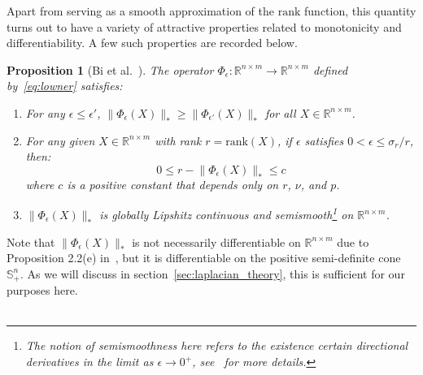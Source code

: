 \documentclass[10pt]{article}
\numberwithin{equation}{section}
\newcommand{\+}{%
	\raisebox{0.18ex}{\scaleobj{0.55}{+}}
}
\newtheorem{proposition}{Proposition}
\theoremstyle{definition}
\theoremstyle{definition}
\begin{document}
\noindent Apart from serving as a smooth approximation of the $\mathrm{rank}$ function, this quantity turns out to have a variety of attractive properties related to monotonicity and differentiability.
\noindent
A few such properties are recorded below. 
\begin{proposition}[Bi et al.~\cite{bi2013approximation}] The operator $\Phi_\epsilon: \mathbb{R}^{n \times m} \to \mathbb{R}^{n \times m}$ defined by~\eqref{eq:lowner} satisfies: 
	\begin{enumerate}
		\item For any $\epsilon \leq \epsilon'$, $\lVert \Phi_{\epsilon}(X) \rVert_\ast \geq \lVert \Phi_{\epsilon'}(X) \rVert_\ast$ for all $X \in \mathbb{R}^{n \times m}$.
		\item For any given $X \in \mathbb{R}^{n \times m}$ with rank $r = \mathrm{rank}(X)$, if $\epsilon$ satisfies $0 < \epsilon \leq \sigma_r / r$, then: 
		$$ 0 \leq r - \lVert \Phi_\epsilon(X) \rVert_\ast \leq c $$
		where $c$ is a positive constant that depends only on $r$, $\nu$, and $p$. 
		\item $\lVert \Phi_\epsilon(X) \rVert_\ast$ is globally Lipshitz continuous and semismooth\footnote{The notion of semismoothness here refers to the existence certain directional derivatives in the limit as $\epsilon \to 0^+$, see~\cite{bi2013approximation, bhatia2013matrix} for more details.} on $\mathbb{R}^{n \times m}$.
	\end{enumerate}
\end{proposition}
\noindent Note that $\lVert\Phi_\epsilon(X)\rVert_\ast$ is not necessarily differentiable on $\mathbb{R}^{n \times m}$ due to Proposition 2.2(e) in~\cite{bi2013approximation}, but it is differentiable on the positive semi-definite cone $\mathbb{S}^n_+$. As we will discuss in section~\ref{sec:laplacian_theory}, this is sufficient for our purposes here. 
\\
\\
\end{document}
